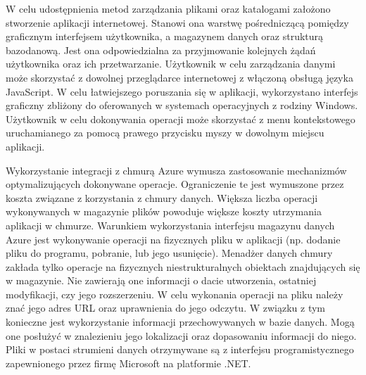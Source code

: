 W celu udostępnienia metod zarządzania plikami oraz katalogami założono stworzenie aplikacji internetowej. Stanowi ona warstwę pośredniczącą pomiędzy graficznym interfejsem użytkownika, a magazynem danych oraz strukturą bazodanową. Jest ona odpowiedzialna za przyjmowanie kolejnych żądań użytkownika oraz ich przetwarzanie. Użytkownik w celu zarządzania danymi może skorzystać z dowolnej przeglądarce internetowej z włączoną obsługą języka JavaScript. W celu łatwiejszego poruszania się w aplikacji, wykorzystano interfejs graficzny zbliżony do oferowanych w systemach operacyjnych z rodziny Windows. Użytkownik w celu dokonywania operacji może skorzystać z menu kontekstowego uruchamianego za pomocą prawego przycisku myszy w dowolnym miejscu aplikacji.

Wykorzystanie integracji z chmurą Azure wymusza zastosowanie mechanizmów optymalizujących dokonywane operacje. Ograniczenie te jest wymuszone przez koszta związane z korzystania z chmury danych. Większa liczba operacji wykonywanych w magazynie plików powoduje większe koszty utrzymania aplikacji w chmurze. Warunkiem wykorzystania interfejsu magazynu danych Azure jest wykonywanie operacji na fizycznych pliku w aplikacji (np. dodanie pliku do programu, pobranie, lub jego usunięcie). Menadżer danych chmury zakłada tylko operacje na fizycznych niestrukturalnych obiektach znajdujących się w magazynie. Nie zawierają one informacji o dacie utworzenia, ostatniej modyfikacji, czy jego rozszerzeniu. W celu wykonania operacji na pliku należy znać jego adres URL oraz uprawnienia do jego odczytu. W związku z tym konieczne jest wykorzystanie informacji przechowywanych w bazie danych. Mogą one posłużyć w znalezieniu jego lokalizacji oraz dopasowaniu informacji do niego. Pliki w postaci strumieni danych otrzymywane są z interfejsu programistycznego zapewnionego przez firmę Microsoft na platformie .NET. 

